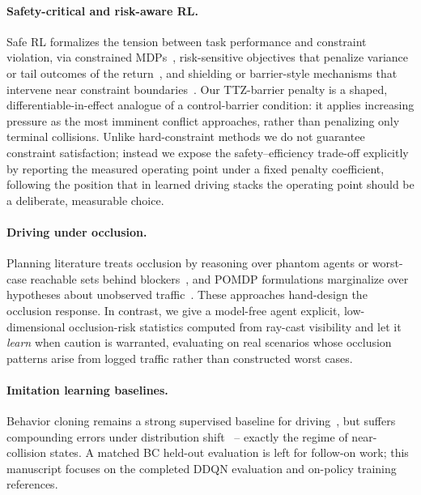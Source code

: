 \documentclass{article}
\begin{document}
\paragraph{Safety-critical and risk-aware RL.}
Safe RL formalizes the tension between task performance and constraint
violation, via constrained MDPs~\citep{altman1999constrained,
achiam2017constrained}, risk-sensitive objectives that penalize variance or
tail outcomes of the return~\citep{garcia2015comprehensive}, and shielding
or barrier-style mechanisms that intervene near constraint
boundaries~\citep{alshiekh2018safe}. Our TTZ-barrier penalty is a shaped,
differentiable-in-effect analogue of a control-barrier condition: it applies
increasing pressure as the most imminent conflict approaches, rather than
penalizing only terminal collisions. Unlike hard-constraint methods we do
not guarantee constraint satisfaction; instead we expose the
safety--efficiency trade-off explicitly by reporting the measured operating
point under a fixed penalty coefficient, following the position that in
learned driving stacks the operating point should be a deliberate,
measurable choice.

\paragraph{Driving under occlusion.}
Planning literature treats occlusion by reasoning over phantom agents or
worst-case reachable sets behind blockers~\citep{orzechowski2018tackling},
and POMDP formulations marginalize over hypotheses about unobserved
traffic~\citep{bouton2018scalable}. These approaches hand-design the
occlusion response. In contrast, we give a model-free agent explicit,
low-dimensional occlusion-risk statistics computed from ray-cast visibility
and let it \emph{learn} when caution is warranted, evaluating on real
scenarios whose occlusion patterns arise from logged traffic rather than
constructed worst cases.

\paragraph{Imitation learning baselines.}
Behavior cloning remains a strong supervised baseline for
driving~\citep{bansal2018chauffeurnet, codevilla2019exploring}, but suffers
compounding errors under distribution shift~\citep{ross2011reduction} --
exactly the regime of near-collision states. A matched BC held-out evaluation
is left for follow-on work; this manuscript focuses on the completed DDQN
evaluation and on-policy training references.
\end{document}
